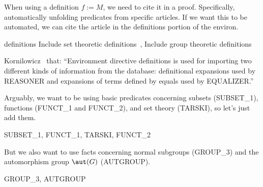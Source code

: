  When using a definition $f := M$, we need to cite it in
a proof. Specifically, automatically unfolding predicates from specific
articles. If we want this to be automated, we can cite the article in
the {\Tt{}definitions\nwendquote} portion of the {\Tt{}environ\nwendquote}.

\nwenddocs{}\endmoddef\nwstartdeflinemarkup{}\nwenddeflinemarkup
definitions \LA{}Include set theoretic definitions~{\nwtagstyle{}}\RA{},
  \LA{}Include group theoretic definitions~{\nwtagstyle{}}\RA{}

\nwendcode{}\nwdocspar

\begin{remark}
  Kornilowicz~\cite[see \S{5.1}]{kornilowicz2015definitional} that:
  ``Environment directive {\Tt{}definitions\nwendquote} is used for importing two different kinds of information from the database: definitional expansions used by REASONER and expansions of terms defined by equals used by EQUALIZER.''
\end{remark}

\M Arguably, we want to be using basic predicates concerning subsets
({\Tt{}SUBSET{\_}1\nwendquote}), functions ({\Tt{}FUNCT{\_}1\nwendquote} and {\Tt{}FUNCT{\_}2\nwendquote}), and set theory
({\Tt{}TARSKI\nwendquote}), so let's just add them.

\nwenddocs{}\endmoddef\nwstartdeflinemarkup{}\nwenddeflinemarkup
SUBSET_1, FUNCT_1, TARSKI, FUNCT_2

\nwendcode{}\nwdocspar

\M
But we also want to use facts concerning normal subgroups ({\Tt{}GROUP{\_}3\nwendquote})
and the automorphism group $\aut(G)$ ({\Tt{}AUTGROUP\nwendquote}).

\nwenddocs{}\endmoddef\nwstartdeflinemarkup{}\nwenddeflinemarkup
GROUP_3, AUTGROUP

